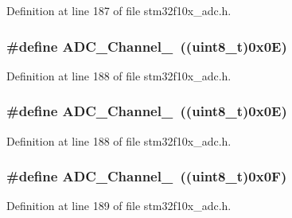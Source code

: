 Definition at line 187 of file stm32f10x\+\_\+adc.\+h.

\subsubsection[{\texorpdfstring{A\+D\+C\+\_\+\+Channel\+\_\+14}{ADC_Channel_14}}]{\setlength{\rightskip}{0pt plus 5cm}\#define A\+D\+C\+\_\+\+Channel\+\_~(({\bf uint8\+\_\+t})0x0\+E)}\hypertarget{group___a_d_c__channels_gaf1830a03fe4a3820fde4f41ba907c394}{}\label{group___a_d_c__channels_gaf1830a03fe4a3820fde4f41ba907c394}


Definition at line 188 of file stm32f10x\+\_\+adc.\+h.

\subsubsection[{\texorpdfstring{A\+D\+C\+\_\+\+Channel\+\_\+14}{ADC_Channel_14}}]{\setlength{\rightskip}{0pt plus 5cm}\#define A\+D\+C\+\_\+\+Channel\+\_~(({\bf uint8\+\_\+t})0x0\+E)}\hypertarget{group___a_d_c__channels_gaf1830a03fe4a3820fde4f41ba907c394}{}\label{group___a_d_c__channels_gaf1830a03fe4a3820fde4f41ba907c394}


Definition at line 188 of file stm32f10x\+\_\+adc.\+h.

\subsubsection[{\texorpdfstring{A\+D\+C\+\_\+\+Channel\+\_\+15}{ADC_Channel_15}}]{\setlength{\rightskip}{0pt plus 5cm}\#define A\+D\+C\+\_\+\+Channel\+\_~(({\bf uint8\+\_\+t})0x0\+F)}\hypertarget{group___a_d_c__channels_ga01431a7b4e388beb241328874abdf88c}{}\label{group___a_d_c__channels_ga01431a7b4e388beb241328874abdf88c}


Definition at line 189 of file stm32f10x\+\_\+adc.\+h.

